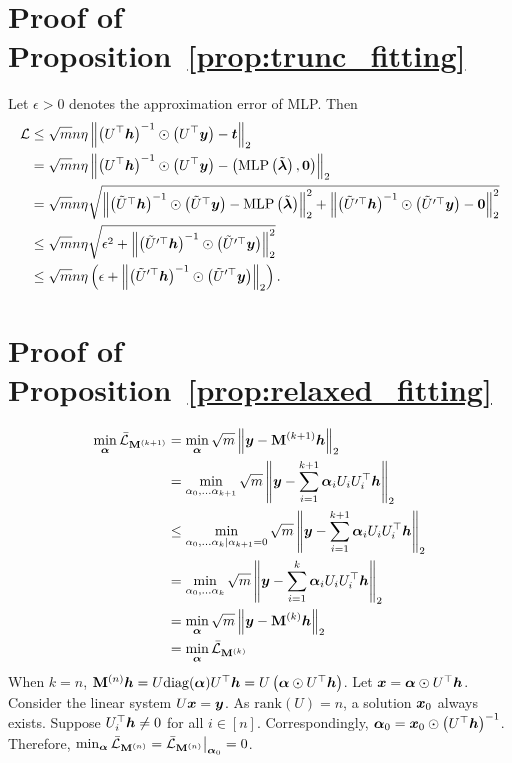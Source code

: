 \documentclass{article} %
\def\valpha{{\bm\alpha}}
\def\vlambda{{\bm\lambda}}
\begin{document}
\section{Proof of Proposition~\ref{prop:trunc_fitting}}
\label{sec:trunc_fitting}
Let $\epsilon>0$ denotes the approximation error of MLP.
Then
\begin{equation}
	\begin{aligned}
		\gL&\leq\sqrt{m}n\eta\left\|\left(U^{\top}\vh\right)^{-1}\odot\left(U^{\top}\vy\right)-\vt\right\|_2\\
		&=\sqrt{m}n\eta\left\|\left(U^{\top}\vh\right)^{-1}\odot\left(U^{\top}\vy\right)-\left(\mathrm{MLP}\left(\tilde\vlambda\right),\mathbf 0\right)\right\|_2\\
		&=\sqrt{m}n\eta\sqrt{\left\|\left(\tilde U^{\top}\vh\right)^{-1}\odot\left(\tilde U^{\top}\vy\right)-\mathrm{MLP}\left(\tilde\vlambda\right)\right\|_2^2+\left\|\left(\tilde U^{\prime\top}\vh\right)^{-1}\odot\left(\tilde U^{\prime\top}\vy\right)-\mathbf 0\right\|_2^2}\\
		&\leq\sqrt{m}n\eta\sqrt{\epsilon^2+\left\|\left(\tilde U^{\prime\top}\vh\right)^{-1}\odot\left(\tilde U^{\prime\top}\vy\right)\right\|_2^2}\\
		&\leq\sqrt{m}n\eta\left(\epsilon+\left\|\left(\tilde U^{\prime\top}\vh\right)^{-1}\odot\left(\tilde U^{\prime\top}\vy\right)\right\|_2\right).
	\end{aligned}
\end{equation}

\section{Proof of Proposition~\ref{prop:relaxed_fitting}}
\label{sec:relaxed_fitting}

\begin{equation}
	\begin{aligned}
		\min_{\valpha}\bar\gL_{\rmM^{(k+1)}}&=\min_{\valpha}\sqrt{m}\left\|\vy-\rmM^{(k+1)}\vh\right\|_2\\
		&=\min_{\alpha_0,\dots\alpha_{k+1}}\sqrt{m}\left\|\vy-\sum_{i=1}^{k+1}\valpha_iU_iU_i^{\top}\vh\right\|_2\\
		&\leq\min_{\alpha_0,\dots\alpha_k|\alpha_{k+1}=0}\sqrt{m}\left\|\vy-\sum_{i=1}^{k+1}\valpha_iU_iU_i^{\top}\vh\right\|_2\\
		&=\min_{\alpha_0,\dots\alpha_k}\sqrt{m}\left\|\vy-\sum_{i=1}^k\valpha_iU_iU_i^{\top}\vh\right\|_2\\
		&=\min_{\valpha}\sqrt{m}\left\|\vy-\rmM^{(k)}\vh\right\|_2\\
		&=\min_{\valpha}\bar\gL_{\rmM^{(k)}}
	\end{aligned}
\end{equation}
When $k=n$, $\rmM^{(n)}\vh=U\mathrm{diag}(\valpha)U^{\top}\vh=U\left(\valpha\odot U^{\top}\vh\right)$.
Let $\vx=\valpha\odot U^{\top}\vh$.
Consider the linear system $U{\bm{x}}={\bm{y}}$.
As $\mathrm{rank}(U)=n$, a solution ${\bm{x}}_0$ always exists.
Suppose $U_i^{\top}{\bm{h}}\neq0$ for all $i\in[n]$.
Correspondingly, $\valpha_0=\vx_0\odot\left(U^{\top}\vh\right)^{-1}$.
Therefore, $\min_{\valpha}\bar\gL_{\rmM^{(n)}}=\bar\gL_{\rmM^{(n)}}\big|_{\valpha_0}=0$.
\end{document}
